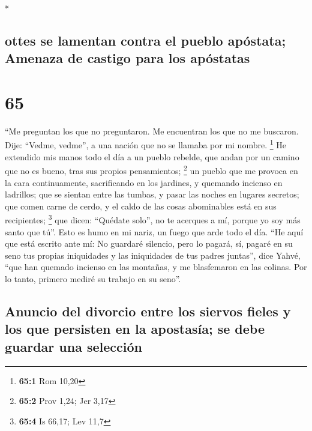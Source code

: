 \begin{paracol}{2}
\begin{otherlanguage}{english}
\end{otherlanguage}

\switchcolumn[0]*

\hypertarget{ottes-se-lamentan-contra-el-pueblo-apuxf3stata-amenaza-de-castigo-para-los-apuxf3statas}{%
\subsection{ottes se lamentan contra el pueblo apóstata; Amenaza de
castigo para los
apóstatas}\label{ottes-se-lamentan-contra-el-pueblo-apuxf3stata-amenaza-de-castigo-para-los-apuxf3statas}}

\hypertarget{section-128}{%
\section{65}\label{section-128}}

 ``Me preguntan los que no preguntaron. Me encuentran los
que no me buscaron. Dije: ``Vedme, vedme'', a una nación que no se
llamaba por mi nombre. \footnote{\textbf{65:1} Rom 10,20} 
He extendido mis manos todo el día a un pueblo rebelde, que andan por un
camino que no es bueno, tras sus propios pensamientos; \footnote{\textbf{65:2}
  Prov 1,24; Jer 3,17}  un pueblo que me provoca en la
cara continuamente, sacrificando en los jardines, y quemando incienso en
ladrillos;  que se sientan entre las tumbas, y pasar las
noches en lugares secretos; que comen carne de cerdo, y el caldo de las
cosas abominables está en sus recipientes; \footnote{\textbf{65:4} Is
  66,17; Lev 11,7}  que dicen: ``Quédate solo'', no te
acerques a mí, porque yo soy más santo que tú''. Esto es humo en mi
nariz, un fuego que arde todo el día.  ``He aquí que está
escrito ante mí: No guardaré silencio, pero lo pagará, sí, pagaré en su
seno  tus propias iniquidades y las iniquidades de tus
padres juntas'', dice Yahvé, ``que han quemado incienso en las montañas,
y me blasfemaron en las colinas. Por lo tanto, primero mediré su trabajo
en su seno''.

\hypertarget{anuncio-del-divorcio-entre-los-siervos-fieles-y-los-que-persisten-en-la-apostasuxeda-se-debe-guardar-una-selecciuxf3n}{%
\subsection{Anuncio del divorcio entre los siervos fieles y los que
persisten en la apostasía; se debe guardar una
selección}\label{anuncio-del-divorcio-entre-los-siervos-fieles-y-los-que-persisten-en-la-apostasuxeda-se-debe-guardar-una-selecciuxf3n}}


\end{paracol}
